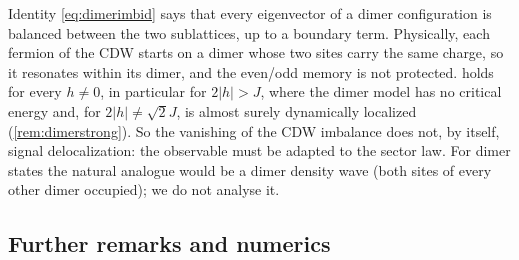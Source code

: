 \begin{remark}\label{rem:dimerimb}
Identity \eqref{eq:dimerimbid} says that every eigenvector of a dimer configuration is balanced
between the two sublattices, up to a boundary term.  Physically, each fermion of the CDW starts on a
dimer whose two sites carry the same charge, so it resonates within its dimer, and the even/odd
memory is not protected.   holds for every $h\ne0$, in particular for
$2|h|>J$, where the dimer model has no critical energy and, for $2|h|\neq\sqrt2J$, is almost surely
dynamically localized (\cref{rem:dimerstrong}).  So the vanishing of the CDW imbalance does not, by itself, signal
delocalization: the observable must be adapted to the sector law.  For dimer states the natural
analogue would be a dimer density wave (both sites of every other dimer occupied); we do not analyse
it.
\end{remark}

\subsection{Further remarks and numerics}\label{sec:dimer:remarks}

